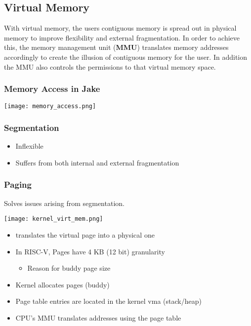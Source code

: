 \subsection{Virtual Memory}
With virtual memory, the users contiguous memory is spread out in physical memory to improve flexibility and external fragmentation.
In order to achieve this, the memory management unit (\textbf{MMU}) translates memory addresses accordingly to create the illusion of contiguous memory for the user. In addition the MMU also controls the permissions to that virtual memory space.

\subsubsection{Memory Access in Jake}
\begin{center}
    \texttt{[image: memory\_access.png]}
\end{center}

\subsubsection{Segmentation}

\begin{itemize}
    \item Inflexible
    \item Suffers from both internal and external fragmentation
\end{itemize}

\subsubsection{Paging}
Solves issues arising from segmentation.

\begin{center}
    \texttt{[image: kernel\_virt\_mem.png]}
\end{center}

\begin{itemize}
    \item translates the virtual page into a physical one
    \item In RISC-V, Pages have 4 KB (12 bit) granularity
          \begin{itemize}
              \item Reason for buddy page size
          \end{itemize}
    \item Kernel allocates pages (buddy)
    \item Page table entries are located in the kernel vma (stack/heap)
    \item CPU's MMU translates addresses using the page table
\end{itemize}

